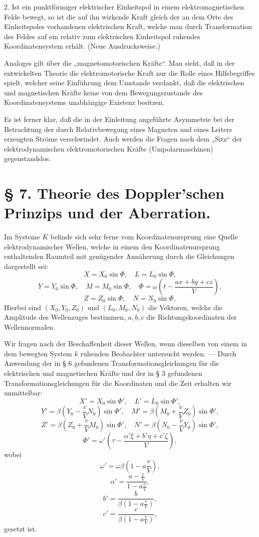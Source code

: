 \documentclass[17pt]{webarticle}       %
\begin{document}
2. Ist ein punktförmiger elektrischer Einheitspol in einem elektromagnetischen Felde bewegt, so ist die auf ihn wirkende Kraft gleich der an dem Orte des Einheitspoles vorhandenen elektrischen Kraft, welche man durch Transformation des Feldes auf ein relativ zum elektrischen Einheitspol ruhendes Koordinatensystem erhält. (Neue Ausdrucksweise.)

Analoges gilt über die „magnetomotorischen Kräfte“. Man sieht, daß in der entwickelten Theorie die elektromotorische Kraft nur die Rolle eines Hilfsbegriffes spielt, welcher seine Einführung dem Umstande verdankt, daß die elektrischen und magnetischen Kräfte keine von dem Bewegungszustande des Koordinatensystems unabhängige Existenz besitzen.

Es ist ferner klar, daß die in der Einleitung angeführte Asymmetrie bei der Betrachtung der durch Relativbewegung eines Magneten und eines Leiters erzeugten Ströme verschwindet. Auch werden die Fragen nach dem „Sitz“ der elektrodynamischen elektromotorischen Kräfte (Unipolarmaschinen) gegenstandslos.

\section*{§ 7. Theorie des Doppler'schen Prinzips und der Aberration.}

Im Systeme \( K \) befinde sich sehr ferne vom Koordinatenursprung eine Quelle elektrodynamischer Wellen, welche in einem den Koordinatenursprung enthaltenden Raumteil mit genügender Annäherung durch die Gleichungen dargestellt sei:
\[
X = X_0 \sin \Phi, \quad L = L_0 \sin \Phi,
\]
\[
Y = Y_0 \sin \Phi, \quad M = M_0 \sin \Phi, \quad \Phi = \omega \left( t - \frac{ax + by + cz}{V} \right),
\]
\[
Z = Z_0 \sin \Phi, \quad N = N_0 \sin \Phi,
\]
Hierbei sind \( (X_0, Y_0, Z_0) \) und \( (L_0, M_0, N_0) \) die Vektoren, welche die Amplitude des Wellenzuges bestimmen, \( a, b, c \) die Richtungskoordinaten der Wellennormalen.

Wir fragen nach der Beschaffenheit dieser Wellen, wenn dieselben von einem in dem bewegten System \( k \) ruhenden Beobachter untersucht werden. — Durch Anwendung der in § 6 gefundenen Transformationsgleichungen für die elektrischen und magnetischen Kräfte und der in § 3 gefundenen Transformationsgleichungen für die Koordinaten und die Zeit erhalten wir unmittelbar:
\[
X' = X_0 \sin \Phi', \quad L' = L_0 \sin \Phi',
\]
\[
Y' = \beta \left( Y_0 - \frac{v}{V} N_0 \right) \sin \Phi', \quad M' = \beta \left( M_0 + \frac{v}{V} Z_0 \right) \sin \Phi',
\]
\[
Z' = \beta \left( Z_0 + \frac{v}{V} M_0 \right) \sin \Phi', \quad N' = \beta \left( N_0 - \frac{v}{V} Y_0 \right) \sin \Phi',
\]
\[
\Phi' = \omega' \left( \tau - \frac{\alpha' \xi + b' \eta + c' \zeta}{V} \right),
\]
wobei
\[
\omega' = \omega \beta \left( 1 - a \frac{v}{V} \right),
\]
\[
\alpha' = \frac{a - \frac{v}{V}}{1 - a \frac{v}{V}},
\]
\[
b' = \frac{b}{\beta \left( 1 - a \frac{v}{V} \right)},
\]
\[
c' = \frac{c}{\beta \left( 1 - a \frac{v}{V} \right)},
\]
gesetzt ist.
\end{document}
